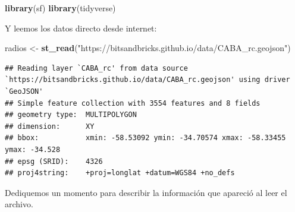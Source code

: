 \documentclass[spanish,]{book}
\newenvironment{Shaded}{\begin{snugshade}}{\end{snugshade}}
\newcommand{\KeywordTok}[1]{\textcolor[rgb]{0.13,0.29,0.53}{\textbf{#1}}}
\newcommand{\NormalTok}[1]{#1}
\newcommand{\StringTok}[1]{\textcolor[rgb]{0.31,0.60,0.02}{#1}}
\begin{document}
\begin{Shaded}
\begin{Highlighting}[]
\KeywordTok{library}\NormalTok{(sf)}
\KeywordTok{library}\NormalTok{(tidyverse)}
\end{Highlighting}
\end{Shaded}

Y leemos los datos directo desde internet:

\begin{Shaded}
\begin{Highlighting}[]
\NormalTok{radios <-}\StringTok{ }\KeywordTok{st_read}\NormalTok{(}\StringTok{"https://bitsandbricks.github.io/data/CABA_rc.geojson"}\NormalTok{)}
\end{Highlighting}
\end{Shaded}

\begin{verbatim}
## Reading layer `CABA_rc' from data source `https://bitsandbricks.github.io/data/CABA_rc.geojson' using driver `GeoJSON'
## Simple feature collection with 3554 features and 8 fields
## geometry type:  MULTIPOLYGON
## dimension:      XY
## bbox:           xmin: -58.53092 ymin: -34.70574 xmax: -58.33455 ymax: -34.528
## epsg (SRID):    4326
## proj4string:    +proj=longlat +datum=WGS84 +no_defs
\end{verbatim}

Dediquemos un momento para describir la información que apareció al leer el archivo.
\end{document}
